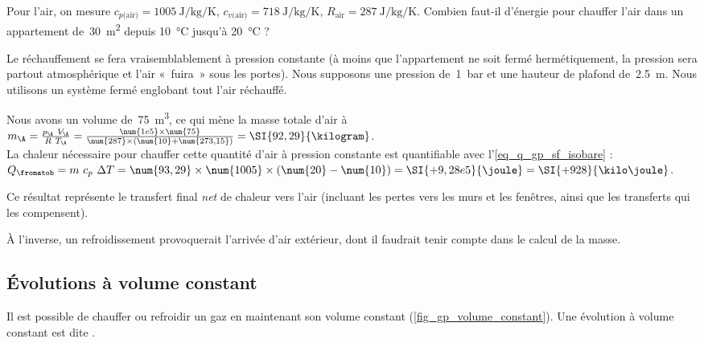 		\begin{anexample}
			Pour l’air, on mesure $c_{p\text{(air)}} = \SI{1005}{\joule\per\kilogram\per\kelvin}$, $c_{v\text{(air)}} = \SI{718}{\joule\per\kilogram\per\kelvin}$, $R_\text{air} = \SI{287}{\joule\per\kilogram\per\kelvin}$.
			Combien faut-il d’énergie pour chauffer l’air dans un appartement de~\SI{30}{\metre\squared} depuis \SI{10}{\degreeCelsius} jusqu’à \SI{20}{\degreeCelsius} ?
				\begin{answer}
					Le réchauffement se fera vraisemblablement à pression constante (à moins que l’appartement ne soit fermé hermétiquement, la pression sera partout atmosphérique et l’air «~fuira~» sous les portes). Nous supposons une pression de~\SI{1}{\bar} et une hauteur de plafond de~\SI{2,5}{\metre}. Nous utilisons un système fermé englobant tout l’air réchauffé.
					
					Nous avons un volume de~\SI{75}{\metre\cubed}, ce qui mène la masse totale d’air à $m_\A = \frac{p_\A \ V_\A}{R \ T_\A} = \frac{\num{1e5} \times \num{75}}{\num{287} \times (\num{10} + \num{273,15})} = \SI{92,29}{\kilogram}$.\\
					La chaleur nécessaire pour chauffer cette quantité d’air à pression constante est quantifiable avec l’\cref{eq_q_gp_sf_isobare} : $Q_\fromatob = m \ c_p \ \Delta T = \num{93,29} \times \num{1005} \times (\num{20} - \num{10}) = \SI{+9,28e5}{\joule} = \SI{+928}{\kilo\joule}$.
				\end{answer}
					\begin{remark}Ce résultat représente le transfert final \emph{net} de chaleur vers l’air (incluant les pertes vers les murs et les fenêtres, ainsi que les transferts qui les compensent).\end{remark}
					\begin{remark}À l’inverse, un refroidissement provoquerait l’arrivée d’air extérieur, dont il faudrait tenir compte dans le calcul de la masse.\end{remark}
		\end{anexample}

	\subsection{Évolutions à volume constant}
	\label{ch_gp_isochores}

		Il est possible de chauffer ou refroidir un gaz en maintenant son volume constant (\cref{fig_gp_volume_constant}). Une évolution à volume constant est dite .
			
